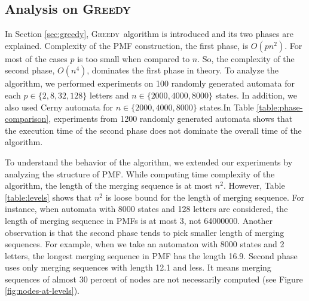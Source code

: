 \documentclass[12pt]{article}
\newcommand{\greedyAlgo}{\textsc{Greedy}}
\begin{document}
\subsection{Analysis on \greedyAlgo}
\label{sec:greedy-analysis}


In Section \ref{sec:greedy}, \greedyAlgo\ algorithm  is introduced and its two phases are explained. Complexity of the PMF construction, the first phase, is $O(pn^2)$. For most of the cases $p$ is too small when compared to $n$. So, the complexity of the second phase, $O(n^4)$, dominates the first phase in theory. To analyze the algorithm, we performed experiments on 100 randomly generated automata for each  $p \in \{2, 8, 32, 128\}$ letters and  $n \in \{2000, 4000, 8000\}$ states. In addition, we also used Cerny automata \cite{cerny} for $n \in \{2000, 4000, 8000\}$ states.In Table \ref{table:phase-comparison}, experiments from 1200 randomly generated automata shows that the execution time of the second phase does not dominate the overall time of the algorithm.

\begin{table}[ht]
	\center
	\caption{Sequential PMF construction time ($t_{PMF}$), and overall time ($t_{ALL}$) in seconds}
	\label{table:phase-comparison}
\end{table}

To understand the behavior of the algorithm, we extended our experiments by analyzing the structure of PMF. While computing time complexity of the algorithm, the length of the merging sequence is at most $n^2$. However, Table \ref{table:levels} shows that $n^2$ is loose bound for the length of merging sequence. For instance, when automata with 8000 states and 128 letters are considered, the length of merging sequence in PMFs is at most 3, not 64000000. Another observation is that the second phase tends to pick smaller length of merging sequences. For example, when we take an automaton with 8000 states and 2 letters, the longest merging sequence in PMF has the length 16.9. Second phase uses only merging sequences with length 12.1 and less. It means merging sequences of almost 30 percent of nodes are not necessarily computed (see Figure \ref{fig:nodes-at-levels}).
\end{document}
